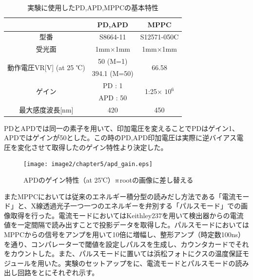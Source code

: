 \begin{table}[H]
  \centering
    \begin{tabular}{ccc}
    \toprule
          & PD,APD  & MPPC \\
    \midrule
    型番    & S8664-11 &  S12571-050C \\
    受光面   & 1mm$\times$1mm & 1mm$\times$1mm \\
    \multirow{2}[0]{*}{動作電圧VR[V] (at 25 ℃)} & 50 (M=1) & \multirow{2}[0]{*}{66.58} \\
          & 394.1 (M=50) &  \\
    \multirow{2}[0]{*}{ゲイン} & PD : 1 & \multirow{2}[0]{*}{1:25$\times$ $10^6$} \\
          & APD : 50 &  \\
    最大感度波長[nm] & 420   & 450 \\
    \bottomrule
    \end{tabular}
     \caption{実験に使用したPD,APD,MPPCの基本特性}
  \label{soshi_tokusei}
\end{table}

PDとAPDでは同一の素子を用いて、印加電圧を変えることでPDはゲイン1、APDではゲインが50とした。この時のPD,APD印加電圧は実際に逆バイアス電圧を変化させて取得したのゲイン特性より決定した。

\begin{figure}[H]
 \begin{center}
 \texttt{[image: image2/chapter5/apd\_gain.eps]}
 \end{center}
 \caption{APDのゲイン特性（at 25℃）※rootの画像に差し替える}
 \label{fig:apd_gain}
\end{figure}


またMPPCにおいては従来のエネルギー積分型の読みだし方法である「電流モード」と、X線透過光子一つ一つのエネルギーを弁別する「パルスモード」での画像取得を行った。電流モードにおいてはKeithley237を用いて検出器からの電流値を一定間隔で読み出すことで投影データを取得した。パルスモードにおいてはMPPCからの信号をアンプを用いて10倍に増幅し、整形アンプ（時定数100ns）を通り、コンパレーターで閾値を設定しパルスを生成し、カウンタカードでそれをカウントした。また、パルスモードに置いては浜松フォトにクスの温度保証モジュールを用いた。実験のセットアップをに、電流モードとパルスモードの読み出し回路をとにそれぞれ示す。

